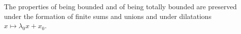 The properties of being bounded and of being totally bounded are preserved under the formation of finite sums and unions and under dilatations $x \mapsto \lambda_0 x + x_0$.
